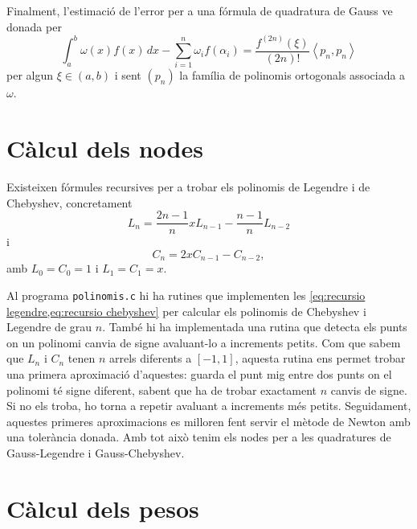 \documentclass[12pt]{article}
\numberwithin{table}{section}
\numberwithin{figure}{section}
\numberwithin{equation}{section}
\newcommand{\inn}[2]{\left\langle #1 , #2 \right\rangle}
\begin{document}
Finalment, l'estimació de l'error per a una fórmula de quadratura de Gauss ve donada per 
\begin{equation} \label{eq:error gauss}
	\int_a^b \omega(x) f(x) \,dx - \sum_{i = 1}^n \omega_i f(\alpha_i) = \frac{f^{(2n)}(\xi)}{(2n)!} \inn{p_n}{p_n}
\end{equation}
per algun \( \xi \in (a,b) \) i sent \( (p_n) \) la família de polinomis ortogonals associada a \( \omega \). 

\section{Càlcul dels nodes}
Existeixen fórmules recursives per a trobar els polinomis de Legendre i de Chebyshev, concretament
\begin{equation} \label{eq:recursio legendre}
	L_n = \frac{2n-1}{n}xL_{n-1} - \frac{n-1}{n}L_{n-2}
\end{equation}
i
\begin{equation} \label{eq:recursio chebyshev}
	C_n = 2xC_{n-1} - C_{n-2},
\end{equation}
amb \( L_0 = C_0 = 1 \) i \( L_1 = C_1 = x \). 

Al programa \texttt{polinomis.c} hi ha rutines que implementen les \cref{eq:recursio legendre,eq:recursio chebyshev} per calcular els polinomis de Chebyshev i Legendre de grau \( n \). També hi ha implementada una rutina que detecta els punts on un polinomi canvia de signe avaluant-lo a increments petits. Com que sabem que \( L_n \) i \( C_n \) tenen \( n \) arrels diferents a \( [-1,1] \), aquesta rutina ens permet trobar una primera aproximació d'aquestes: guarda el punt mig entre dos punts on el polinomi té signe diferent, sabent que ha de trobar exactament \( n \) canvis de signe. Si no els troba, ho torna a repetir avaluant a increments més petits. Seguidament, aquestes primeres aproximacions es milloren fent servir el mètode de Newton amb una tolerància donada. Amb tot això tenim els nodes per a les quadratures de Gauss-Legendre i Gauss-Chebyshev.     

\section{Càlcul dels pesos}
\end{document}
